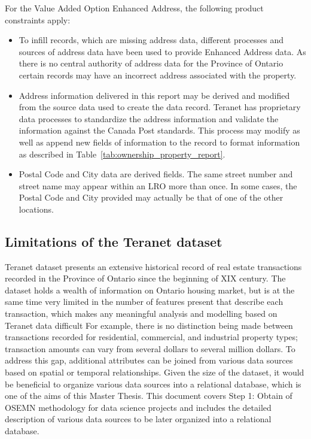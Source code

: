 \documentclass[11pt]{article}
\begin{document}
    For the Value Added Option \textemdash Enhanced Address, the following product constraints apply:
    \begin{itemize}
        \item To infill records, which are missing address data, different processes and sources of address data have been used to provide Enhanced Address data.
        As there is no central authority of address data for the Province of Ontario certain records may have an incorrect address associated with the property.
        \item Address information delivered in this report may be derived and modified from the source data used to create the data record.
        Teranet has proprietary data processes to standardize the address information and validate the information against the Canada Post standards.
        This process may modify as well as append new fields of information to the record to format information as described in Table~\ref{tab:ownership_property_report}.
        \item Postal Code and City data are derived fields.
        The same street number and street name may appear within an LRO more than once.
        In some cases, the Postal Code and City provided may actually be that of one of the other locations.
    \end{itemize}

    \subsection{Limitations of the Teranet dataset} \label{subsec:teranet_limitations}

    Teranet dataset presents an extensive historical record of real estate transactions recorded in the Province of Ontario since the beginning of XIX century.
    The dataset holds a wealth of information on Ontario housing market, but is at the same time very limited in the number of features present that describe each transaction, which makes any meaningful analysis and modelling based on Teranet data difficult
    For example, there is no distinction being made between transactions recorded for residential, commercial, and industrial property types;
    transaction amounts can vary from several dollars to several million dollars.
    To address this gap, additional attributes can be joined from various data sources based on spatial or temporal relationships.
    Given the size of the dataset, it would be beneficial to organize various data sources into a relational database, which is one of the aims of this Master Thesis.
    This document covers Step 1: Obtain of OSEMN methodology for data science projects and includes the detailed description of various data sources to be later organized into a relational database.

    
    
\end{document}
